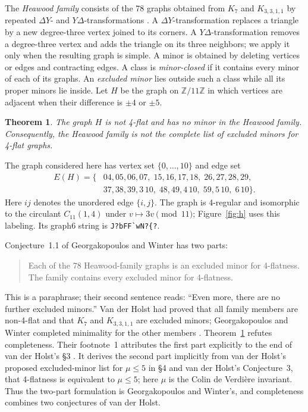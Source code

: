 \documentclass[11pt]{article}
\newtheorem{theorem}{Theorem}
\begin{document}
The \emph{Heawood family} consists of the 78 graphs obtained from $K_7$
and $K_{3,3,1,1}$ by repeated $\Delta Y$- and $Y\Delta$-transformations
\cite[\S1.1]{GW}. A $\Delta Y$-transformation replaces a triangle by a new
degree-three vertex joined to its corners. A $Y\Delta$-transformation
removes a degree-three vertex and adds the triangle on its three
neighbors; we apply it only when the resulting graph is simple.
A minor is obtained by deleting vertices or edges and contracting edges.
A class is \emph{minor-closed} if it contains every minor of each of its
graphs. An \emph{excluded minor} lies outside such a class while all its
proper minors lie inside.
Let $H$ be the graph on $\mathbb Z/11\mathbb Z$ in which vertices are
adjacent when their difference is $\pm4$ or $\pm5$.

\begin{theorem}\label{thm:main}
The graph $H$ is not 4-flat and has no minor in the Heawood family.
Consequently, the Heawood family is not the complete list of excluded
minors for 4-flat graphs.
\end{theorem}

The graph considered here has vertex set $\{0,\ldots,10\}$ and edge set
\[
\begin{split}
E(H)=\{&
04,05,06,07,\;15,16,17,18,\;26,27,28,29,\\
&37,38,39,3\,10,\;48,49,4\,10,\;59,5\,10,\;6\,10\}.
\end{split}
\]
Here $ij$ denotes the unordered edge $\{i,j\}$. The graph is 4-regular and isomorphic to the circulant $C_{11}(1,4)$
under $v\mapsto3v\pmod{11}$;
Figure~\ref{fig:h} uses this labeling. Its graph6 string is
\verb|J?bFF`wN?{?|.

Conjecture~1.1 of Georgakopoulos and Winter \cite{GW} has two parts:
\begin{quote}
Each of the 78 Heawood-family graphs is an excluded minor for 4-flatness.
The family contains every excluded minor for 4-flatness.
\end{quote}
This is a paraphrase; their second sentence reads:
``Even more, there are no further excluded minors.''
Van der Holst had proved that all family members are non-4-flat and that
$K_7$ and $K_{3,3,1,1}$ are excluded minors; Georgakopoulos and Winter
completed minimality for the other members \cite[\S1.1, Theorem 6.1]{GW}.
Theorem~\ref{thm:main} refutes completeness.
Their footnote~1 attributes the first part explicitly to the end of
van der Holst's \S3 \cite{vdH}. It derives the second part implicitly
from van der Holst's proposed excluded-minor list for $\mu\le5$ in \S4 and
van der Holst's
Conjecture~3, that 4-flatness is equivalent to $\mu\le5$; here $\mu$ is
the Colin de Verdi\`ere invariant. Thus the two-part formulation is
Georgakopoulos and Winter's, and completeness combines two conjectures
of van der Holst.
\end{document}
